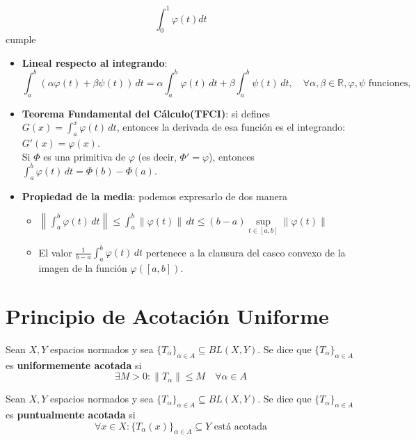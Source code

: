 \documentclass[12pt]{book}
\newcommand{\tbf}{\textbf}
\newcommand{\R}{\mathbb{R}}
\begin{document}
$$\int_{0}^{1} \varphi(t) dt$$
cumple
\begin{itemize}
    \item \tbf{Lineal respecto al integrando}:
    \begin{equation*}
        \int_{a}^{b} (\alpha \varphi(t) + \beta \psi(t)) \, dt = \alpha \int_{a}^{b} \varphi(t) \, dt + \beta \int_{a}^{b} \psi(t) \, dt, \quad \forall  \alpha,\beta\in \R, \varphi, \psi \text{ funciones},
    \end{equation*}
    \item \tbf{Teorema Fundamental del Cálculo(TFCI)}: si defines $G(x) = \int_{a}^{x} \varphi(t) \, dt$, entonces la derivada de esa función es el integrando: $G'(x) = \varphi(x)$. \\
    Si $\Phi$ es una primitiva de $\varphi$ (es decir, $\Phi' = \varphi$), entonces $\int_{a}^{b} \varphi(t) \, dt = \Phi(b) - \Phi(a)$.
    \item \tbf{Propiedad de la media}: podemos expresarlo de dos manera
    \begin{itemize}
        \item $\left\| \int_{a}^{b} \varphi(t) \, dt \right\| \leq \int_{a}^{b} \|\varphi(t)\| \, dt \leq (b-a) \sup\limits_{t \in [a,b]} \|\varphi(t)\|$
        \item El valor $\frac{1}{b-a} \int_{a}^{b} \varphi(t) \, dt$ pertenece a la clausura del casco convexo de la imagen de la función $\varphi([a,b])$.
    \end{itemize}
\end{itemize}

\chapter{Principio de Acotación Uniforme}

\begin{definicion}
    Sean $X, Y$ espacios normados y sea $\{T_\alpha\}_{\alpha \in A} \subseteq BL(X, Y)$. Se dice que $\{T_\alpha\}_{\alpha \in A}$ es \textbf{uniformemente acotada} si
    \begin{equation*}
        \exists M > 0 : \|T_\alpha\| \leq M \quad \forall \alpha \in A
    \end{equation*}
\end{definicion}

\begin{definicion}
    Sean $X, Y$ espacios normados y sea $\{T_\alpha\}_{\alpha \in A} \subseteq BL(X, Y)$. Se dice que $\{T_\alpha\}_{\alpha \in A}$ es \textbf{puntualmente acotada} si
    \begin{equation*}
        \forall x \in X : \{T_\alpha(x)\}_{\alpha \in A} \subseteq Y \text{ está acotada}
    \end{equation*}
\end{definicion}
\end{document}
